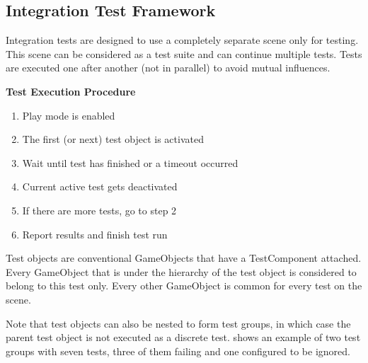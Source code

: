 
    \subsection{Integration Test Framework}
        Integration tests are designed to use a completely separate scene only for testing.
        This scene can be considered as a test suite  and
        can continue multiple tests. Tests are executed one after another (not in parallel) to avoid mutual influences.

        \textbf{Test Execution Procedure} \label{unityIntTestExecOrder}
        \begin{enumerate}
            \setlength\itemsep{-0.4em}
            \item Play mode is enabled
            \item The first (or next) test object is activated
            \item Wait until test has finished or a timeout occurred
            \item Current active test gets deactivated
            \item If there are more tests, go to step 2
            \item Report results and finish test run
        \end{enumerate}

        Test objects are conventional GameObjects that have a TestComponent attached.
        Every GameObject that is under the hierarchy of the test object is considered to belong to this test only.
        Every other GameObject is common for every test on the scene.

        Note that test objects can also be nested to form test groups, in which case the parent test object is not executed as a discrete test.
         shows an example of two test groups with seven tests, three of them failing and one configured to be ignored.

